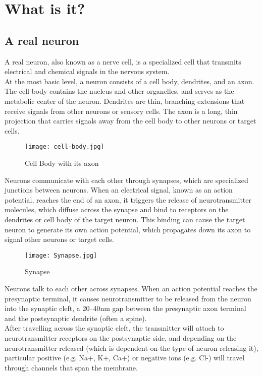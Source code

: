 
\section{What is it?}
\subsection{A real neuron}
A real neuron, also known as a nerve cell, is a specialized cell that transmits
electrical and chemical signals in the nervous system.\\
At the most basic level, a neuron consists of a cell body, dendrites, and an axon.
The cell body contains the nucleus and other organelles, and serves as the metabolic center
of the neuron. Dendrites are thin, branching extensions that receive signals from other
neurons or sensory cells. The axon is a long, thin projection that carries signals away
from the cell body to other neurons or target cells.
\begin{figure}[h]
  \centering
  \texttt{[image: cell-body.jpg]}
  \caption{Cell Body with its axon}
\end{figure}
Neurons communicate with each other through synapses, which are specialized
junctions between neurons. When an electrical signal, known as an action potential,
reaches the end of an axon, it triggers the release of neurotransmitter molecules, which diffuse
across the synapse and bind to receptors on the dendrites or cell body of the target neuron. This
binding can cause the target neuron to generate its own action potential, which propagates down its
axon to signal other neurons or target cells.
\begin{figure}[h]
  \centering
  \texttt{[image: Synapse.jpg]}
  \caption{Synapse}
\end{figure}

Neurons talk to each other across synapses. When an action potential reaches the
presynaptic terminal, it causes neurotransmitter to be released from the neuron into the synaptic
cleft, a 20–40nm gap between the presynaptic axon terminal and the postsynaptic dendrite
(often a spine).\\
After travelling across the synaptic cleft, the transmitter will attach to neurotransmitter
receptors on the postsynaptic side, and depending on the neurotransmitter released
(which is dependent on the type of neuron releasing it), particular positive (e.g. Na+, K+, Ca+)
or negative ions (e.g. Cl-) will travel through channels that span the membrane.
